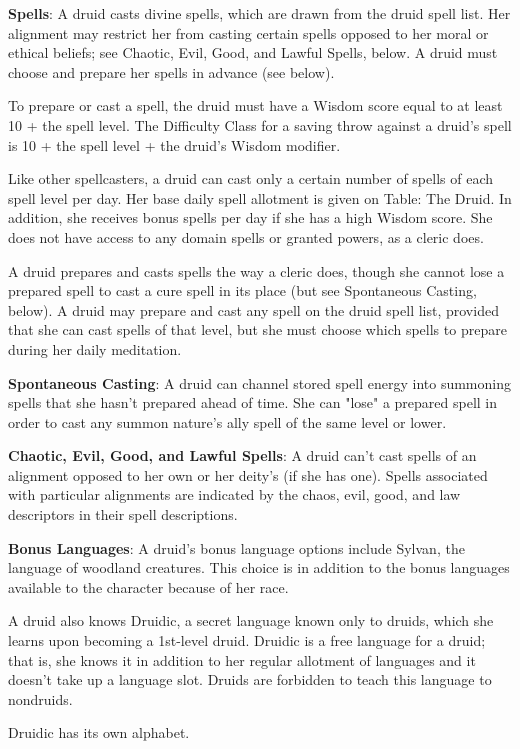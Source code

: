 \textbf{Spells}: A druid casts divine spells, which are drawn from the druid spell list. Her alignment may restrict her from casting certain spells opposed to her moral or ethical beliefs; see Chaotic, Evil, Good, and Lawful Spells, below. A druid must choose and prepare her spells in advance (see below).

To prepare or cast a spell, the druid must have a Wisdom score equal to at least 10 + the spell level. The Difficulty Class for a saving throw against a druid’s spell is 10 + the spell level + the druid’s Wisdom modifier.

Like other spellcasters, a druid can cast only a certain number of spells of each spell level per day. Her base daily spell allotment is given on Table: The Druid. In addition, she receives bonus spells per day if she has a high Wisdom score. She does not have access to any domain spells or granted powers, as a cleric does.

A druid prepares and casts spells the way a cleric does, though she cannot lose a prepared spell to cast a cure spell in its place (but see Spontaneous Casting, below). A druid may prepare and cast any spell on the druid spell list, provided that she can cast spells of that level, but she must choose which spells to prepare during her daily meditation.

\textbf{Spontaneous Casting}: A druid can channel stored spell energy into summoning spells that she hasn’t prepared ahead of time. She can "lose" a prepared spell in order to cast any summon nature’s ally spell of the same level or lower.

\textbf{Chaotic, Evil, Good, and Lawful Spells}: A druid can’t cast spells of an alignment opposed to her own or her deity’s (if she has one). Spells associated with particular alignments are indicated by the chaos, evil, good, and law descriptors in their spell descriptions.

\textbf{Bonus Languages}: A druid’s bonus language options include Sylvan, the language of woodland creatures. This choice is in addition to the bonus languages available to the character because of her race.

A druid also knows Druidic, a secret language known only to druids, which she learns upon becoming a 1st-level druid. Druidic is a free language for a druid; that is, she knows it in addition to her regular allotment of languages and it doesn’t take up a language slot. Druids are forbidden to teach this language to nondruids.

Druidic has its own alphabet.


